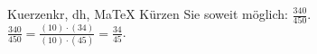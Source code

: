 \begin{MAufgabe}{Kuerzen}{kr, dh, MaTeX}
K\"urzen Sie soweit m\"oglich: $\frac{340}{450}$.\\ 
\ifLsg\MLoesung
\quad $\frac{340}{450}=\frac{(10)\cdot(34)}{(10)\cdot(45)}=\frac{34}{45}$.\else\relax\fi
 \end{MAufgabe}